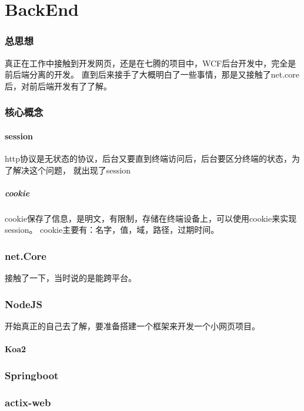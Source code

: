 \clearpage
\part{BackEnd}

\section{总思想}
真正在工作中接触到开发网页，还是在七腾的项目中，WCF后台开发中，完全是前后端分离的开发。
直到后来接手了大概明白了一些事情，那是又接触了net.core后，对前后端开发有了了解。

\section{核心概念}

\subsection{session}
http协议是无状态的协议，后台又要直到终端访问后，后台要区分终端的状态，为了解决这个问题，
就出现了session
\subsubsection{cookie}
cookie保存了信息，是明文，有限制，存储在终端设备上，可以使用cookie来实现session。
cookie主要有：名字，值，域，路径，过期时间。

\section{net.Core}
接触了一下，当时说的是能跨平台。

\section{NodeJS}
开始真正的自己去了解，要准备搭建一个框架来开发一个小网页项目。

\subsection{Koa2}


\section{Springboot}

\section{actix-web}


